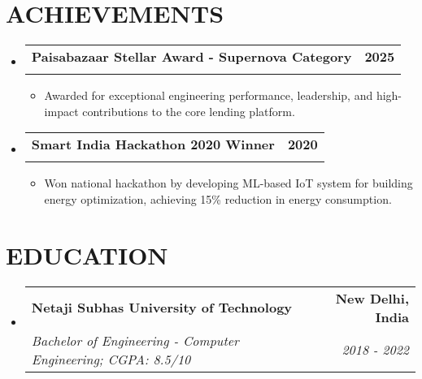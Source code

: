 \documentclass[letterpaper,11pt]{article}
\makeatletter
\newcommand{\resumeSubheading}[4]{
  \vspace{-2pt}\item
    \begin{tabular*}{1.0\textwidth}[t]{l@{\extracolsep{\fill}}r}
      \textbf{\large#1} & \textbf{\small #2} \\
      \textit{\large#3} & \textit{\small #4} \\
    \end{tabular*}\vspace{-7pt}
}
\newcommand{\resumeItem}[1]{
  \item\small{
    {#1 \vspace{-2pt}}
  }
}
\newcommand{\resumeSubHeadingListStart}{\begin{itemize}[leftmargin=0.0in, label={}]}
\newcommand{\resumeSubHeadingListEnd}{\end{itemize}}
\newcommand{\resumeItemListStart}{\begin{itemize}}
\newcommand{\resumeItemListEnd}{\end{itemize}\vspace{-5pt}}
\makeatother
\begin{document}
\section{ACHIEVEMENTS}
  \resumeSubHeadingListStart
  \resumeSubheading
      {Paisabazaar Stellar Award - Supernova Category}{2025}{}{}
      \vspace{-15pt}
      \resumeItemListStart
    \resumeItem{Awarded for exceptional engineering performance, leadership, and high-impact contributions to the core lending platform.}
\resumeItemListEnd
    \resumeSubheading
      {Smart India Hackathon 2020 Winner}{2020}{}{}
      \vspace{-15pt}
      \resumeItemListStart
        \resumeItem{Won national hackathon by developing ML-based IoT system for building energy optimization, achieving 15\% reduction in energy consumption.}
      \resumeItemListEnd
  \resumeSubHeadingListEnd

\section{EDUCATION}
  \resumeSubHeadingListStart
    \resumeSubheading
      {Netaji Subhas University of Technology}{New Delhi, India}
      {Bachelor of Engineering - Computer Engineering; CGPA: 8.5/10}{2018 - 2022}
  \resumeSubHeadingListEnd
\end{document}
